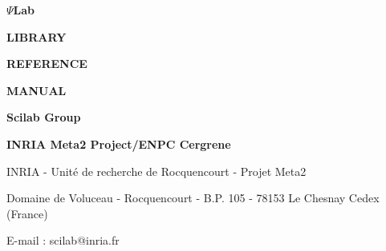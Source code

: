 
\pagestyle{empty}


\newpage

\vspace{8.cm}

\Huge\bf  {$\Psi$Lab}

\Huge\bf  {LIBRARY}

\Huge\bf  {REFERENCE}

\Huge\bf  {MANUAL}

\vspace{3.cm}

\Huge\bf {Scilab Group}

\Large\bf
INRIA Meta2 Project/ENPC Cergrene

\normalsize

\vspace{12.cm}

INRIA - Unit\'e de recherche de Rocquencourt - Projet Meta2

Domaine de Voluceau - Rocquencourt - B.P. 105 - 78153 Le Chesnay Cedex (France)

E-mail : scilab@inria.fr

\normalsize

\tableofcontents

\pagestyle{headings}

